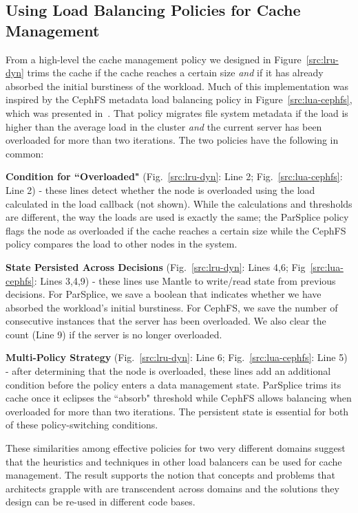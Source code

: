 \subsection{Using Load Balancing Policies for Cache Management}

From a high-level the cache management policy we designed in
Figure~\ref{src:lru-dyn} trims the cache if the cache reaches a certain size
{\it and} if it has already absorbed the initial burstiness of the workload.
Much of this implementation was inspired by the CephFS metadata load
balancing policy in Figure~\ref{src:lua-cephfs}, which was presented
in~\cite{sevilla:sc15-mantle}. That policy migrates file system metadata if the
load is higher than the average load in the cluster {\it and} the current
server has been overloaded for more than two iterations. The two policies have
the following in common:

\textbf{Condition for ``Overloaded"} (Fig.~\ref{src:lru-dyn}: Line 2;
Fig.~\ref{src:lua-cephfs}: Line 2) - these lines detect whether the node is
overloaded using the load calculated in the load callback (not shown). While
the calculations and thresholds are different, the way the loads are used is
exactly the same; the ParSplice policy flags the node as overloaded if the
cache reaches a certain size while the CephFS policy compares the load to other
nodes in the system.

\textbf{State Persisted Across Decisions} (Fig.~\ref{src:lru-dyn}: Lines 4,6;
Fig~\ref{src:lua-cephfs}: Lines 3,4,9) - these lines use Mantle to write/read state
from previous decisions.  For ParSplice, we save a boolean that indicates
whether we have absorbed the workload's initial burstiness. For CephFS, we save
the number of consecutive instances that the server has been overloaded. We
also clear the count (Line 9) if the server is no longer overloaded. 

\textbf{Multi-Policy Strategy} (Fig.~\ref{src:lru-dyn}: Line 6;
Fig.~\ref{src:lua-cephfs}: Line 5) - after determining that the node is
overloaded, these lines add an additional condition before the policy enters a
data management state.  ParSplice trims its cache once it eclipses the
``absorb" threshold while CephFS allows balancing when overloaded for more than
two iterations. The persistent state is essential for both of these
policy-switching conditions.

These similarities among effective policies for two very different domains
suggest that the heuristics and techniques in other load balancers can be used
for cache management. The result supports the notion that concepts and problems
that architects grapple with are transcendent across domains and the solutions
they design can be re-used in different code bases.


